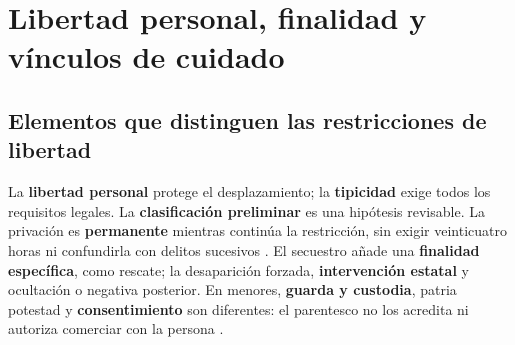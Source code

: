 \documentclass[spanish,letterpaper,oneside]{article}
\begin{document}
\section{Libertad personal, finalidad y vínculos de cuidado}
\subsection*{Elementos que distinguen las restricciones de libertad}
La \textbf{libertad personal} protege el desplazamiento; la \textbf{tipicidad} exige todos los requisitos legales. La \textbf{clasificación preliminar} es una hipótesis revisable. La privación es \textbf{permanente} mientras continúa la restricción, sin exigir veinticuatro horas ni confundirla con delitos sucesivos \citep[pp.~67 y 409]{amuchateguiPenal2012}. El secuestro añade una \textbf{finalidad específica}, como rescate; la desaparición forzada, \textbf{intervención estatal} y ocultación o negativa posterior. En menores, \textbf{guarda y custodia}, patria potestad y \textbf{consentimiento} son diferentes: el parentesco no los acredita ni autoriza comerciar con la persona \citep{secuestroS5,desaparicionS5,cpdfS4Vigente}.

\end{document}
